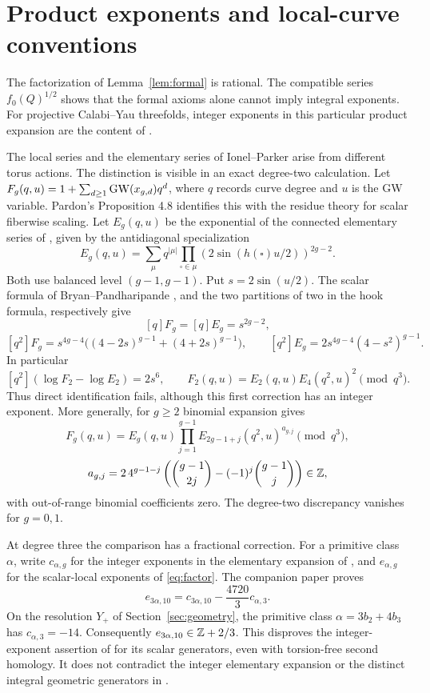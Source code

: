 \section{Product exponents and local-curve conventions}\label{sec:integrality}

The factorization of Lemma~\ref{lem:formal} is rational. The
compatible series $f_0(Q)^{1/2}$ shows that the formal axioms alone
cannot imply integral exponents. For projective Calabi--Yau
threefolds, integer exponents in this particular product expansion
are the content of \cite[Conjecture 1.4]{Pardon}.

The local series and the elementary series of Ionel--Parker
\cite{IP} arise from different torus actions. The distinction is
visible in an exact degree-two calculation.
Let $F_g(q,u)=1+\sum_{d\ge1}\operatorname{GW}(x_{g,d})q^d$, where $q$ records
curve degree and $u$ is the GW variable. Pardon's
Proposition 4.8 identifies this with the residue theory for scalar
fiberwise scaling. Let $E_g(q,u)$ be the exponential of the
connected elementary series of \cite[Proposition 3.3]{IP}, given by
the antidiagonal specialization
\[
 E_g(q,u)=\sum_\mu q^{|\mu|}
    \prod_{\square\in\mu}(2\sin(h(\square)u/2))^{2g-2}.
\]
Both use balanced level $(g-1,g-1)$. Put $s=2\sin(u/2)$.
The scalar formula of Bryan--Pandharipande
\cite[Section 8]{BP}, and the two partitions of two in
the hook formula, respectively give
\[
 [q]F_g=[q]E_g=s^{2g-2},
\]
\[
 [q^2]F_g=s^{4g-4}\bigl((4-2s)^{g-1}+(4+2s)^{g-1}\bigr),
 \qquad [q^2]E_g=2s^{4g-4}(4-s^2)^{g-1}.
\]
In particular
\begin{equation}\label{eq:discrepancy}
 [q^2](\log F_2-\log E_2)=2s^6,\qquad
 F_2(q,u)=E_2(q,u)E_4(q^2,u)^2\pmod{q^3}.
\end{equation}
Thus direct identification fails, although this first correction
has an integer exponent. More generally, for $g\ge2$ binomial
expansion gives
\[
 F_g(q,u)=E_g(q,u)\prod_{j=1}^{g-1}
 E_{2g-1+j}(q^2,u)^{a_{g,j}}\pmod{q^3},
\]
\[
 a_{g,j}=2\,4^{g-1-j}
 \left(\binom{g-1}{2j}-(-1)^j\binom{g-1}{j}\right)\in\mathbb Z,
\]
with out-of-range binomial coefficients zero. The degree-two
discrepancy vanishes for $g=0,1$.

At degree three the comparison has a fractional correction. For a
primitive class $\alpha$, write $c_{\alpha,g}$ for the integer
exponents in the elementary expansion of \cite[Theorem 8.1]{IP},
and $e_{\alpha,g}$ for the scalar-local exponents of
\eqref{eq:factor}. The companion paper \cite{WuebbenIntegrality}
proves
\[
 e_{3\alpha,10}=c_{3\alpha,10}-\frac{4720}{3}c_{\alpha,3}.
\]
On the resolution $Y_+$ of Section~\ref{sec:geometry}, the primitive
class $\alpha=3b_2+4b_3$ has $c_{\alpha,3}=-14$. Consequently
$e_{3\alpha,10}\in\mathbb Z+2/3$. This disproves the integer-exponent
assertion of \cite[Conjecture 1.4]{Pardon} for its scalar generators,
even with torsion-free second homology. It does not contradict the
integer elementary expansion or the distinct integral geometric
generators in \cite[Theorem 1.2]{Pardon}.

